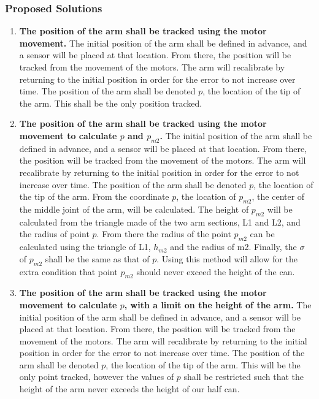 \documentclass[letterpaper,10pt]{article}
\begin{document}
\subsubsection{Proposed Solutions}
\begin{enumerate}
\item{
\textbf{The position of the arm shall be tracked using the motor movement.}
The initial position of the arm shall be defined in advance, and a sensor will be placed at that location. 
From there, the position will be tracked from the movement of the motors.
The arm will recalibrate by returning to the initial position in order for the error to not increase over
 time.
The position of the arm shall be denoted \(p\), the location of the tip of the arm.
This shall be the only position tracked.
}
\item{
\textbf{The position of the arm shall be tracked using the motor movement to calculate \(p\) and 
\(p_{m2}\).}
The initial position of the arm shall be defined in advance, and a sensor will be placed at that location. 
From there, the position will be tracked from the movement of the motors.
The arm will recalibrate by returning to the initial position in order for the error to not increase over
 time.
The position of the arm shall be denoted \(p\), the location of the tip of the arm.
From the coordinate \(p\), the location of \(p_{m2}\), the center of the middle joint of the arm, will be
 calculated. The height of \(p_{m2}\) will be calculated from the triangle made of the two arm sections, 
L1 and L2, and the radius of point \(p\). From there the radius of the point \(p_{m2}\) can be calculated
 using the triangle of L1, \(h_{m2}\) and the radius of m2. Finally, the \(\sigma\) of \(p_{m2}\) shall 
be the same as that of \(p\).
Using this method will allow for the extra condition that point \(p_{m2}\) should never exceed the height
 of the can.
}
\item{
\textbf{The position of the arm shall be tracked using the motor movement to calculate \(p\), with a
 limit on the height of the arm.}
The initial position of the arm shall be defined in advance, and a sensor will be placed at that location. 
From there, the position will be tracked from the movement of the motors.
The arm will recalibrate by returning to the initial position in order for the error to not increase over
 time.
The position of the arm shall be denoted \(p\), the location of the tip of the arm.
This will be the only point tracked, however the values of \(p\) shall be restricted such that the 
height of the arm never exceeds the height of our half can.
}


\end{enumerate}
\end{document}
